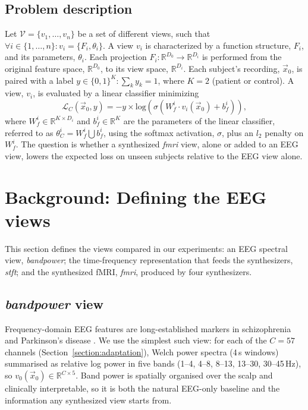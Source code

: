 \documentclass{article}
\begin{document}
\subsection*{Problem description}\label{section:problem_description}

Let $\mathcal{V} = \{v_1, \dots, v_n\}$ be a set of different views, such that $\forall i \in \{1, \dots, n\}: v_i = \{F_i, \theta_i\}$. A view $v_i$ is characterized by a function structure, $F_i$, and its parameters, $\theta_i$. Each projection $F_i: \mathbb{R}^{D_0} \to \mathbb{R}^{D_i}$ is performed from the original feature space, $\mathbb{R}^{D_0}$, to its view space, $\mathbb{R}^{D_i}$. Each subject's recording, $\vec{x}_0$, is paired with a label $y \in \{0,1\}^K: \sum_k y_k=1$, where $K=2$ (patient or control). A view, $v_i$, is evaluated by a linear classifier minimizing
\begin{equation}\label{equation:loss}
    \mathcal{L}_C(\vec{x}_0, y) = -y \times \mbox{log}(\sigma(W^i_f \cdot  v_i(\vec{x}_0) + b^i_f)),
\end{equation}
where $W^i_f \in \mathbb{R}^{K \times D_i}$ and $b^i_f \in \mathbb{R}^K$ are the parameters of the linear classifier, referred to as $\theta_C^i = W^i_f \bigcup b^i_f$, using the softmax activation, $\sigma$, plus an $l_2$ penalty on $W^i_f$. The question is whether a synthesized \textit{fmri} view, alone or added to an EEG view, lowers the expected loss on unseen subjects relative to the EEG view alone.

\section{Background: Defining the EEG views}\label{section:eeg_views}

This section defines the views compared in our experiments: an EEG spectral view, \textit{bandpower}; the time-frequency representation that feeds the synthesizers, \textit{stft}; and the synthesized fMRI, \textit{fmri}, produced by four synthesizers.

\subsection{\textit{bandpower} view}\label{eeg_views:bandpower}

Frequency-domain EEG features are long-established markers in schizophrenia and Parkinson's disease \cite{itil1977qualitative,roach2008event,bates2009low,barros2021advanced}. We use the simplest such view: for each of the $C=57$ channels (Section~\ref{section:adaptation}), Welch power spectra (4\,s windows) summarised as relative log power in five bands (1--4, 4--8, 8--13, 13--30, 30--45\,Hz), so $v_0(\vec{x}_0) \in \mathbb{R}^{C\times5}$. Band power is spatially organised over the scalp and clinically interpretable, so it is both the natural EEG-only baseline and the information any synthesized view starts from.
\end{document}
